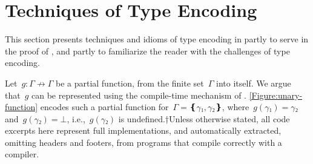 \documentclass[a4paper,USenglish]{lipics-v2016}
\numberwithin{equation}{section}
\numberwithin{figure}{section}
\def\ReplaceInThesis#1#2{#1}
\begin{document}
\section{Techniques of Type Encoding}
\label{section:toolkit}
This section presents techniques and idioms of type encoding in \Java 
  partly to serve in the proof of , 
  and partly to familiarize the reader with 
  the challenges of type encoding. 

Let~$g:Γ↛Γ$ be a partial function,
  from the finite set~$Γ$ into itself.
We argue that~$g$ can
  be represented using the compile-time mechanism of \Java.
  \cref{Figure:unary-function\ReplaceInThesis{}{-b}} encodes such a partial function for~$Γ=❴γ₁,γ₂❵$, where~$g(γ₁)=γ₂$
  and~$g(γ₂)=⊥$, i.e.,~$g(γ₂)$ is undefined.†{Unless otherwise stated,
      all code excerpts here represent full implementations,
      and automatically extracted, omitting headers and footers,
    from \Java programs that compile correctly with a  compiler.}
\end{document}
